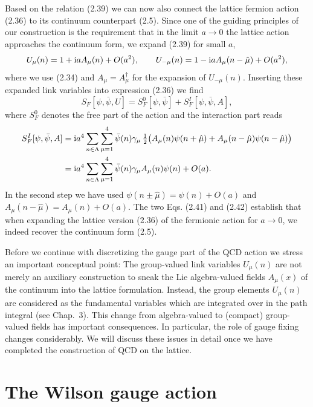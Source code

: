 Based on the relation (2.39) we can now also connect the lattice fermion
action (2.36) to its continuum counterpart (2.5). Since one of the guiding
principles of our construction is the requirement that in the limit
$a \to 0$ the lattice action approaches the continuum form, we expand (2.39)
for small $a$,
\begin{equation}
  U_\mu(n) = 1 + \mathrm{i} a A_\mu(n) + O(a^2) , \qquad
  U_{-\mu}(n) = 1 - \mathrm{i} a A_\mu(n - \hat\mu) + O(a^2) ,
\end{equation}
where we use (2.34) and $A_\mu = A_\mu^\dagger$ for the expansion of
$U_{-\mu}(n)$. Inserting these expanded link variables into expression
(2.36) we find
\begin{equation}
  S_F[\psi, \bar\psi, U] = S_F^0[\psi, \bar\psi] + S_F^I[\psi, \bar\psi, A] ,
\end{equation}
where $S_F^0$ denotes the free part of the action and the interaction part
reads
\begin{equation}
  \begin{split}
    S_F^I[\psi, \bar\psi, A] &= \mathrm{i} a^4 \sum_{n\in\Lambda}\sum_{\mu=1}^{4}
      \bar\psi(n) \gamma_\mu\,
      \tfrac{1}{2}\big(A_\mu(n) \psi(n + \hat\mu) + A_\mu(n - \hat\mu)
        \psi(n - \hat\mu)\big) \\
    &= \mathrm{i} a^4 \sum_{n\in\Lambda}\sum_{\mu=1}^{4}
      \bar\psi(n) \gamma_\mu A_\mu(n) \psi(n) + O(a) .
  \end{split}
\end{equation}
In the second step we have used $\psi(n \pm \hat\mu) = \psi(n) + O(a)$ and
$A_\mu(n - \hat\mu) = A_\mu(n) + O(a)$. The two Eqs. (2.41) and (2.42)
establish that when expanding the lattice version (2.36) of the fermionic
action for $a \to 0$, we indeed recover the continuum form (2.5).

Before we continue with discretizing the gauge part of the QCD action we
stress an important conceptual point: The group-valued link variables
$U_\mu(n)$ are not merely an auxiliary construction to sneak the Lie
algebra-valued fields $A_\mu(x)$ of the continuum into the lattice
formulation. Instead, the group elements $U_\mu(n)$ are considered as the
fundamental variables which are integrated over in the path integral (see
Chap.~3). This change from algebra-valued to (compact) group-valued fields
has important consequences. In particular, the role of gauge fixing changes
considerably. We will discuss these issues in detail once we have completed
the construction of QCD on the lattice.

\section{The Wilson gauge action}


